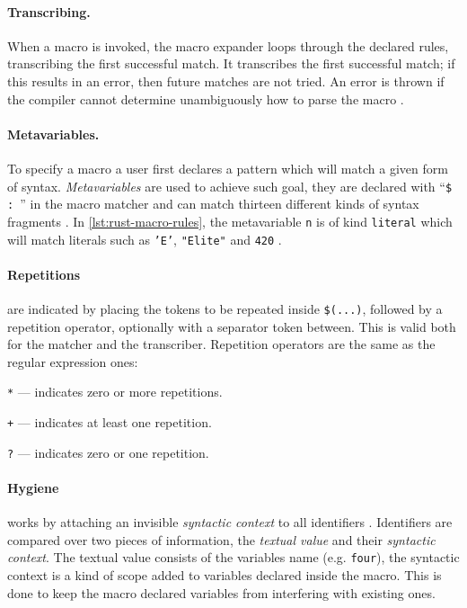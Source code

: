 \paragraph{Transcribing.}
When a macro is invoked, the macro expander loops through the declared rules, transcribing the first successful match.
It transcribes the first successful match; if this results in an error, then future matches are not tried.
An error is thrown if the compiler cannot determine unambiguously how to parse the macro
\autocite[Section 3.1 - Transcribing]{RustRef2021}.

\paragraph{Metavariables.}
To specify a macro a user first declares a pattern which will match a given form of syntax.
\emph{Metavariables} are used to achieve such goal,
they are declared with “\texttt{\$  : }” in the macro matcher and
can match thirteen different kinds of syntax fragments \autocite[Section 3.1 - Metavariables]{RustRef2021}.
In \autoref{lst:rust-macro-rules}, the metavariable \texttt{n} is of kind \texttt{literal}
which will match literals such as \texttt{'E'}, \texttt{"Elite"} and \texttt{420} \autocite[Section 8.2.1]{RustRef2021}.

\paragraph{Repetitions} are indicated by placing the tokens to be repeated inside \texttt{\$(...)},
followed by a repetition operator, optionally with a separator token between.
This is valid both for the matcher and the transcriber.
Repetition operators are the same as the regular expression ones:
\begin{compactitem}
	\item \texttt{*} — indicates zero or more repetitions.
	\item \texttt{+} — indicates at least one repetition.
	\item \texttt{?} — indicates zero or one repetition.
\end{compactitem}

\paragraph{Hygiene} works by attaching an invisible \emph{syntactic context} to all identifiers \autocite{Wirth2021}.
Identifiers are compared over two pieces of information,
the \emph{textual value} and their \emph{syntactic context}.
The textual value consists of the variables name (e.g. \texttt{four}),
the syntactic context is a kind of scope added to variables declared inside the macro.
This is done to keep the macro declared variables from interfering with existing ones.

